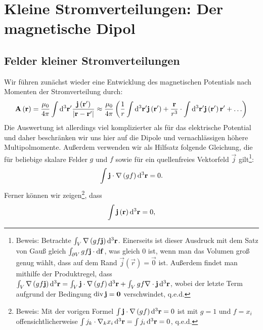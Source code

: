 \section{Kleine Stromverteilungen: Der magnetische Dipol}

\subsection{Felder kleiner Stromverteilungen}

Wir führen zunächst wieder eine Entwicklung des magnetischen Potentials nach Momenten der Stromverteilung durch:
\begin{equation}
	\label{eq:entwicklung_magn_potential}
	\mathbf{A}\left(\mathbf{r}\right)=\frac{\mu _{0}}{4\pi }\int \mathop{}\!\mathrm{d} ^{3}\mathbf{r}'\frac{\mathbf{j}\left(\mathbf{r}'\right)}{\left| \mathbf{r}-\mathbf{r}'\right| }\approx \frac{\mu _{0}}{4\pi }\left(\frac{1}{r}\int \mathop{}\!\mathrm{d} ^{3}\mathbf{r}'\mathbf{j}\left(\mathbf{r}'\right)+\frac{\mathbf{r}}{r^{3}}\cdot \int \mathop{}\!\mathrm{d} ^{3}\mathbf{r}'\mathbf{j}\left(\mathbf{r}'\right)\mathbf{r}'+\ldots \right)
\end{equation}
Die Auswertung ist allerdings viel komplizierter als für das elektrische Potential und daher beschränken wir uns hier auf die Dipole und vernachlässigen höhere Multipolmomente. Außerdem verwenden wir als Hilfsatz folgende Gleichung, die für beliebige skalare Felder $g$ und $f$ sowie für ein quellenfreies Vektorfeld $\vec {j}$ gilt\footnote{Beweis: Betrachte $\int _{V}\nabla \left(gf\mathbf{j}\right)\mathop{}\!\mathrm{d} ^{3}\mathbf{r}$. Einerseits ist dieser Ausdruck mit dem Satz von Gauß gleich $\int _{\partial V}gf\mathbf{j}\cdot \mathop{}\!\mathrm{d} \mathbf{f}$, was gleich $0$ ist, wenn man das Volumen groß genug wählt, dass auf dem Rand $\vec {j}\left(\vec {r}\right)=\vec {0}$ ist. Außerdem findet man mithilfe der Produktregel, dass $\int _{V}\nabla \left(gf\mathbf{j}\right)\mathop{}\!\mathrm{d} ^{3}\mathbf{r}=\int _{V}\mathbf{j}\cdot \nabla \left(gf\right)\mathop{}\!\mathrm{d} ^{3}\mathbf{r}+\int _{V}gf\nabla \cdot \mathbf{j}\mathop{}\!\mathrm{d} ^{3}\mathbf{r}$, wobei der letzte Term aufgrund der Bedingung $\operatorname{div} \mathbf{j}=\mathbf{0}$ verschwindet, q.e.d.}:
\begin{equation}
	\label{eq:hilfssatz}
	\int \mathbf{j}\cdot \nabla \left(gf\right)\mathop{}\!\mathrm{d} ^{3}\mathbf{r}=0.
\end{equation}
Ferner können wir zeigen\footnote{Beweis: Mit der vorigen Formel $\int \mathbf{j}\cdot \nabla \left(gf\right)\mathop{}\!\mathrm{d} ^{3}\mathbf{r}=0$ ist mit $g=1$ und $f=x_{i}$ offensichtlicherweise $\int j_{k}\cdot \nabla _{k}x_{i}\mathop{}\!\mathrm{d} ^{3}\mathbf{r}=\int j_{i}\mathop{}\!\mathrm{d} ^{3}\mathbf{r}=0$, q.e.d. }, dass
\begin{equation*}
	\int \mathbf{j}\left(\mathbf{r}\right)\mathop{}\!\mathrm{d} ^{3}\mathbf{r}=0,
\end{equation*}
